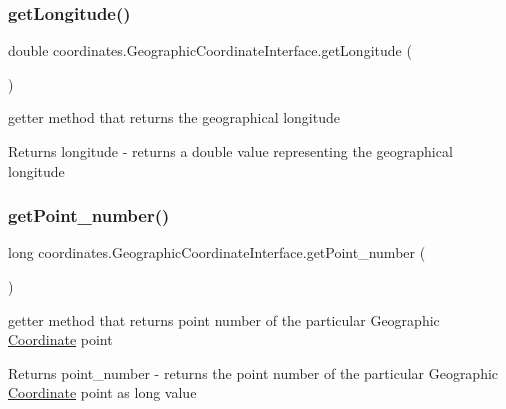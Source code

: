\subsubsection{\texorpdfstring{get\+Longitude()}{getLongitude()}}
{\footnotesize\ttfamily double coordinates.\+Geographic\+Coordinate\+Interface.\+get\+Longitude (\begin{DoxyParamCaption}{ }\end{DoxyParamCaption})}



getter method that returns the geographical longitude 

\begin{DoxyReturn}{Returns}
longitude -\/ returns a double value representing the geographical longitude 
\end{DoxyReturn}
\mbox{\label{classcoordinates_1_1_geographic_coordinate_interface_acdd7ae9bfafda4672d697221bd9b0bd2}} 
\subsubsection{\texorpdfstring{get\+Point\+\_\+number()}{getPoint\_number()}}
{\footnotesize\ttfamily long coordinates.\+Geographic\+Coordinate\+Interface.\+get\+Point\+\_\+number (\begin{DoxyParamCaption}{ }\end{DoxyParamCaption})}



getter method that returns point number of the particular Geographic \hyperlink{classcoordinates_1_1_coordinate}{Coordinate} point 

\begin{DoxyReturn}{Returns}
point\+\_\+number -\/ returns the point number of the particular Geographic \hyperlink{classcoordinates_1_1_coordinate}{Coordinate} point as long value 
\end{DoxyReturn}
\mbox{\label{classcoordinates_1_1_geographic_coordinate_interface_ac9c19d2f8667c6eecb0674106cabbe63}} 
